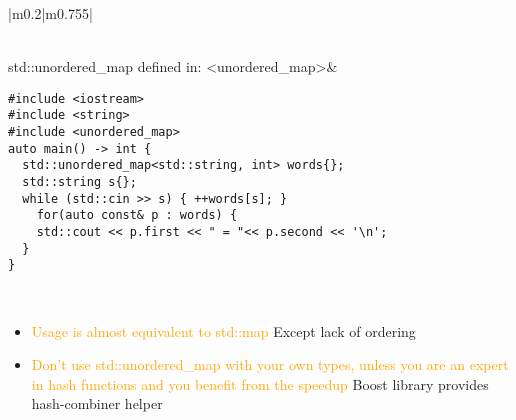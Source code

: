 \documentclass[main.tex,fontsize=8pt,paper=a4,paper=portrait,DIV=calc]{scrartcl}
\begin{document}
\begin{table}[ht!]
\begin{tabular}{|m{0.2\linewidth}|m{0.755\linewidth}|}
\begin{itemize}
\end{itemize} \\
\hline
std::unordered\_map \newline
defined in: <unordered\_map>& 
\begin{lstlisting}
#include <iostream>
#include <string>
#include <unordered_map>
auto main() -> int {
  std::unordered_map<std::string, int> words{};
  std::string s{};
  while (std::cin >> s) { ++words[s]; }
    for(auto const& p : words) {
    std::cout << p.first << " = "<< p.second << '\n';
  }
}
\end{lstlisting}
\, \newline
\begin{itemize}
\item \textcolor{orange}{Usage is almost equivalent to std::map}\newline
  Except lack of ordering
\item \textcolor{orange}{Don't use std::unordered\_map with your own types, unless you are an expert in hash functions and you benefit from the speedup}\newline
  Boost library provides hash-combiner helper
\vspace{-2mm}
\end{itemize} \\
\hline
\end{tabular}

\end{table}
\end{document}

